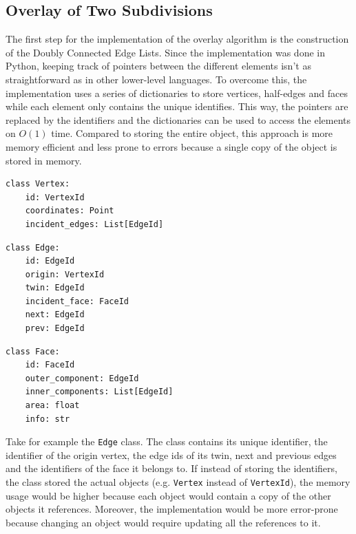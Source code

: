 \subsection{Overlay of Two Subdivisions}
The first step for the implementation of the overlay algorithm is the construction of the Doubly Connected Edge Lists. Since the implementation was done in Python, keeping track of pointers between the different elements isn't as straightforward as in other lower-level languages. To overcome this, the implementation uses a series of dictionaries to store vertices, half-edges and faces while each element only contains the unique identifies. This way, the pointers are replaced by the identifiers and the dictionaries can be used to access the elements on $O(1)$ time. Compared to storing the entire object, this approach is more memory efficient and less prone to errors because a single copy of the object is stored in memory.

\begin{minipage}{0.5\linewidth}
    \begin{lstlisting}
class Vertex:
    id: VertexId
    coordinates: Point
    incident_edges: List[EdgeId]
\end{lstlisting}
\end{minipage}
\begin{minipage}{0.5\linewidth}
    \begin{lstlisting}
class Edge:
    id: EdgeId
    origin: VertexId
    twin: EdgeId
    incident_face: FaceId
    next: EdgeId
    prev: EdgeId
\end{lstlisting}
\end{minipage}

\begin{minipage}{\linewidth}
    \begin{lstlisting}
class Face:
    id: FaceId
    outer_component: EdgeId
    inner_components: List[EdgeId]
    area: float
    info: str
\end{lstlisting}
\end{minipage}

Take for example the \texttt{Edge} class. The class contains its unique identifier, the identifier of the origin vertex, the edge ids of its twin, next and previous edges and the identifiers of the face it belongs to. If instead of storing the identifiers, the class stored the actual objects (e.g. \texttt{Vertex} instead of \texttt{VertexId}), the memory usage would be higher because each object would contain a copy of the other objects it references. Moreover, the implementation would be more error-prone because changing an object would require updating all the references to it.

